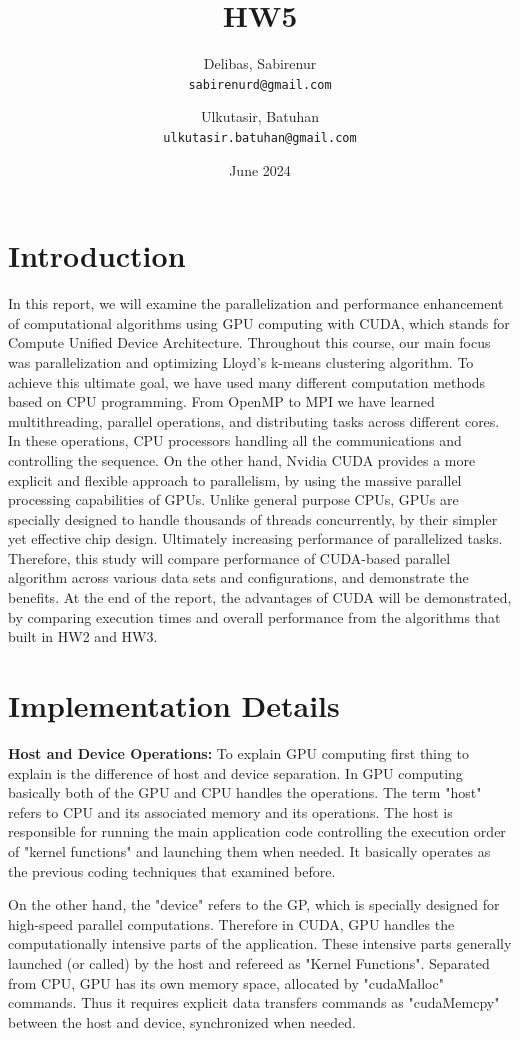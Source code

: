 \documentclass{article}
\title{HW5}
\author{Delibas, Sabirenur\\
  \texttt{sabirenurd@gmail.com}
  \and
  Ulkutasir, Batuhan\\
  \texttt{ulkutasir.batuhan@gmail.com}}
\date{June 2024}
\begin{document}
\maketitle

\section{Introduction}
In this report, we will examine the parallelization and performance enhancement of computational algorithms using GPU computing with CUDA, which stands for Compute Unified Device Architecture. Throughout this course, our main focus was parallelization and optimizing Lloyd's k-means clustering algorithm. To achieve this ultimate goal, we have used many different computation methods based on CPU programming. From OpenMP to MPI we have learned multithreading, parallel operations, and distributing tasks across different cores. In these operations, CPU processors handling all the communications and controlling the sequence. On the other hand, Nvidia CUDA provides a more explicit and flexible approach to parallelism, by using the massive parallel processing capabilities of GPUs. Unlike general purpose CPUs, GPUs are specially designed to handle thousands of threads concurrently, by their simpler yet effective chip design. Ultimately increasing performance of parallelized tasks. Therefore, this study will compare performance of CUDA-based parallel algorithm across various data sets and configurations, and demonstrate the benefits. At the end of the report, the advantages of CUDA will be demonstrated, by comparing execution times and overall performance from the algorithms that built in HW2 and HW3.


\section{Implementation Details}
\textbf{Host and Device Operations:} To explain GPU computing first thing to explain is the difference of host and device separation. In GPU computing basically both of the GPU and CPU handles the operations. The term "host" refers to CPU and its associated memory and its operations. The host is responsible for running the main application code controlling the execution order of "kernel functions" and launching them when needed. It basically operates as the previous coding techniques that examined before.

On the other hand, the "device" refers to the GP, which is specially designed for high-speed parallel computations. Therefore in CUDA, GPU handles the computationally intensive parts of the application. These intensive parts generally launched (or called) by the host and refereed as "Kernel Functions". Separated from CPU, GPU has its own memory space, allocated by "cudaMalloc" commands. Thus it requires explicit data transfers commands as "cudaMemcpy" between the host and device, synchronized when needed. 
\end{document}
